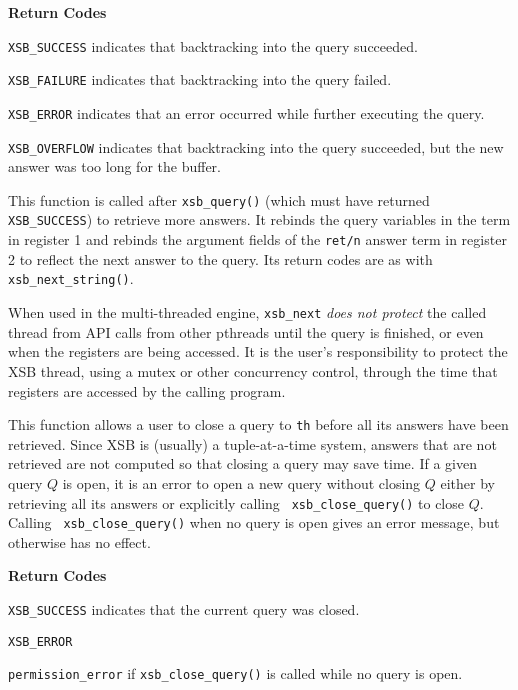\begin{description}
{\bf Return Codes}  
\bi
\item {\tt XSB\_SUCCESS} indicates that backtracking into the query succeeded.
%
\item {\tt XSB\_FAILURE} indicates that backtracking into the query failed.
%
\item {\tt XSB\_ERROR} indicates that an error occurred while further
  executing the query.

\item {\tt XSB\_OVERFLOW} indicates that backtracking into the query succeeded, but the
  new answer was too long for the buffer.
%
\ei

%
This function is called after {\tt xsb\_query()} (which must have
returned {\tt XSB\_SUCCESS}) to retrieve more answers.  It rebinds the
query variables in the term in register 1 and rebinds the argument
fields of the {\tt ret/n} answer term in register 2 to reflect the
next answer to the query.  Its return codes are as with {\tt
  xsb\_next\_string()}.

When used in the multi-threaded engine, {\tt xsb\_next} {\em does not
  protect} the called thread from API calls from other pthreads until
the query is finished, or even when the registers are being accessed.
It is the user's responsibility to protect the XSB thread, using a
mutex or other concurrency control, through the time that registers
are accessed by the calling program.

%
This function allows a user to close a query to {\tt th} before all
its answers have been retrieved.  Since XSB is (usually) a
tuple-at-a-time system, answers that are not retrieved are not
computed so that closing a query may save time.  If a given query $Q$
is open, it is an error to open a new query without closing $Q$ either
by retrieving all its answers or explicitly calling {\tt
  xsb\_close\_query()} to close $Q$.  Calling {\tt
  xsb\_close\_query()} when no query is open gives an error message,
but otherwise has no effect.

{\bf Return Codes}  
\bi
\item {\tt XSB\_SUCCESS} indicates that the current query was closed.
%
\item {\tt XSB\_ERROR} 
\bi
\item {\tt permission\_error} if {\tt xsb\_close\_query()} is
  called while no query is open.
\ei
\ei
  

\end{description}
